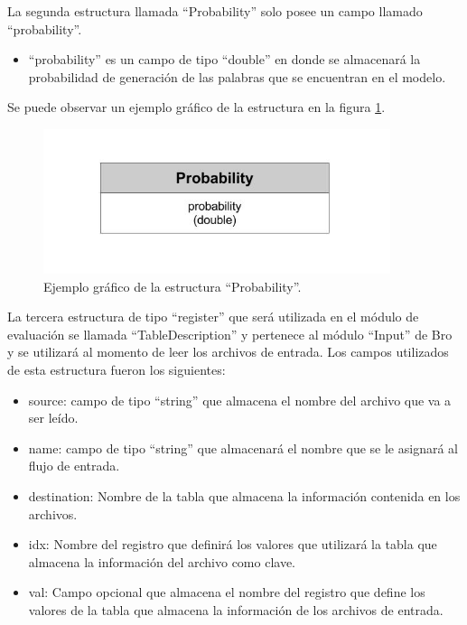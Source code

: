 La segunda estructura llamada ``Probability'' solo posee un campo llamado ``probability''.
\begin{itemize}
\item ``probability'' es un campo de tipo ``double'' en donde se almacenará la probabilidad de generación de las palabras que se encuentran en el modelo.
\end{itemize}

Se puede observar un ejemplo gráfico de la estructura en la figura \ref{fig:Probability}.

\begin{figure}[!htb]
\begin{center}
\includegraphics[width=4in]{./img/Probability.jpg}
\caption{Ejemplo gráfico de la estructura ``Probability''.}
\label{fig:Probability}
\end{center}
\end{figure}	

La tercera estructura de tipo ``register'' que será utilizada en el módulo de evaluación se llamada ``TableDescription'' y pertenece al módulo ``Input'' de Bro y se utilizará al momento de leer los archivos de entrada.
Los campos utilizados de esta estructura fueron los siguientes:
\begin{itemize}
\item source: campo de tipo ``string'' que almacena el nombre del archivo
que va a ser leído.
\item name: campo de tipo ``string'' que almacenará el nombre que se le
asignará al flujo de entrada.
\item destination: Nombre de la tabla que almacena la información contenida
en los archivos.
\item idx: Nombre del registro que definirá los valores que utilizará la tabla que almacena la información del archivo como clave.
\item val: Campo opcional que almacena el nombre del registro que define
los valores de la tabla que almacena la información de los archivos de
entrada.
\end{itemize}

